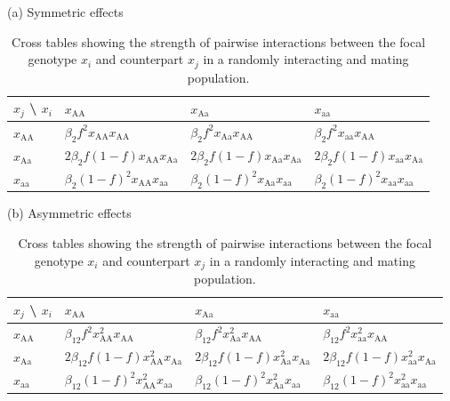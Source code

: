 \documentclass[12pt,]{article}
\begin{document}
\begin{table}[h]
\caption{Cross tables showing the strength of pairwise interactions between the focal genotype $x_i$ and counterpart $x_j$ in a randomly interacting and mating population.}
(a) Symmetric effects \\
\begin{tabular}{|l|lll|}
\hline
$x_j$ \textbackslash{} $x_i$ & $x_\mathrm{AA}$ & $x_\mathrm{Aa}$ & $x_\mathrm{aa}$ \\ \hline
$x_\mathrm{AA}$ & $\beta_2 f^2x_\mathrm{AA}x_\mathrm{AA}$ & $\beta_2f^2x_\mathrm{Aa}x_\mathrm{AA}$ & $\beta_2f^2x_\mathrm{aa}x_\mathrm{AA}$ \\
$x_\mathrm{Aa}$ & $2\beta_2f(1-f)x_\mathrm{AA}x_\mathrm{Aa}$ & $2\beta_2f(1-f)x_\mathrm{Aa}x_\mathrm{Aa}$ & $2\beta_2f(1-f)x_\mathrm{aa}x_\mathrm{Aa}$ \\
$x_\mathrm{aa}$ & $\beta_2(1-f)^2x_\mathrm{AA}x_\mathrm{aa}$ & $\beta_2(1-f)^2x_\mathrm{Aa}x_\mathrm{aa}$ & $\beta_2(1-f)^2x_\mathrm{aa}x_\mathrm{aa}$ \\ \hline
\end{tabular}

\vspace*{5mm}

(b) Asymmetric effects \\
\begin{tabular}{|l|lll|}
\hline
$x_j$ \textbackslash{} $x_i$ & $x_\mathrm{AA}$ & $x_\mathrm{Aa}$ & $x_\mathrm{aa}$ \\ \hline
$x_\mathrm{AA}$ & $\beta_{12}f^2x^2_\mathrm{AA}x_\mathrm{AA}$  &  $\beta_{12}f^2x^2_\mathrm{Aa}x_\mathrm{AA}$  & $\beta_{12}f^2x^2_\mathrm{aa}x_\mathrm{AA}$ \\
$x_\mathrm{Aa}$ & $2\beta_{12}f(1-f)x^2_\mathrm{AA}x_\mathrm{Aa}$ & $2\beta_{12}f(1-f)x^2_\mathrm{Aa}x_\mathrm{Aa}$ &  $2\beta_{12}f(1-f)x^2_\mathrm{aa}x_\mathrm{Aa}$ \\
$x_\mathrm{aa}$ & $\beta_{12}(1-f)^2x^2_\mathrm{AA}x_\mathrm{aa}$ & $\beta_{12}(1-f)^2x^2_\mathrm{Aa}x_\mathrm{aa}$ & $\beta_{12}(1-f)^2x^2_\mathrm{aa}x_\mathrm{aa}$ \\ \hline
\end{tabular}
      \label{tableS2:intTable}
\end{table}
\end{document}
